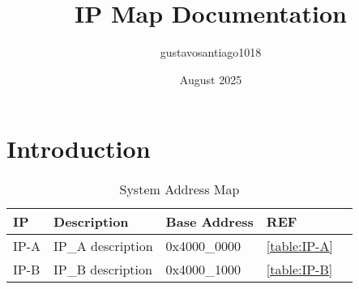 \documentclass{article}
\title{IP Map Documentation}
\author{gustavosantiago1018 }
\date{August 2025}
\begin{document}
\maketitle

\section{Introduction}


\begin{table}[h]
\centering
\caption{System Address Map}
\label{table:system_address_map}
\begin{tabular}{|l|l|l|l|l|}
\hline
\textbf{IP} & \textbf{Description} & \textbf{Base Address} & \textbf{REF} \\ \hline
IP-A & IP\_A description & 0x4000\_0000  & \ref{table:IP-A} \\ \hline
IP-B & IP\_B description & 0x4000\_1000  & \ref{table:IP-B} \\ \hline
\end{tabular}
\end{table}
\end{document}
